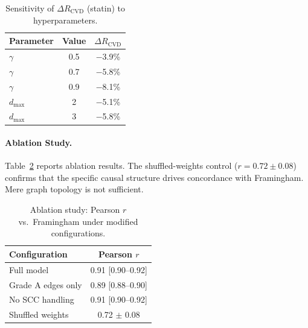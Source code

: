 \documentclass[runningheads]{llncs}
\begin{document}
\renewcommand{\arraystretch}{1.2}
\begin{table}[t]
\centering
\caption{Sensitivity of $\Delta R_{\text{CVD}}$ (statin) to
hyperparameters.}\label{tab:sensitivity}
\small
\begin{tabular}{@{}lcc@{}}
\toprule
\textbf{Parameter} & \textbf{Value} & \textbf{$\Delta R_{\text{CVD}}$} \\
\midrule
$\gamma$ & 0.5 & $-$3.9\% \\
$\gamma$ & 0.7 & $-$5.8\% \\
$\gamma$ & 0.9 & $-$8.1\% \\
$d_{\max}$ & 2 & $-$5.1\% \\
$d_{\max}$ & 3 & $-$5.8\% \\
\bottomrule
\end{tabular}
\end{table}
\renewcommand{\arraystretch}{1.0}

\paragraph{Ablation Study.}\label{sec:ablation}
Table~\ref{tab:ablation} reports ablation results.
The shuffled-weights control ($r = 0.72 \pm 0.08$) confirms that the
specific causal structure drives concordance with Framingham.
Mere graph topology is not sufficient.

\renewcommand{\arraystretch}{1.2}
\begin{table}[t]
\centering
\caption{Ablation study: Pearson $r$ vs.\ Framingham under
modified configurations.}\label{tab:ablation}
\small
\begin{tabular}{@{}lc@{}}
\toprule
\textbf{Configuration} & \textbf{Pearson $r$} \\
\midrule
Full model           & 0.91 [0.90--0.92] \\
Grade A edges only   & 0.89 [0.88--0.90] \\
No SCC handling      & 0.91 [0.90--0.92] \\
Shuffled weights     & 0.72 $\pm$ 0.08 \\
\bottomrule
\end{tabular}
\end{table}
\renewcommand{\arraystretch}{1.0}
\end{document}
